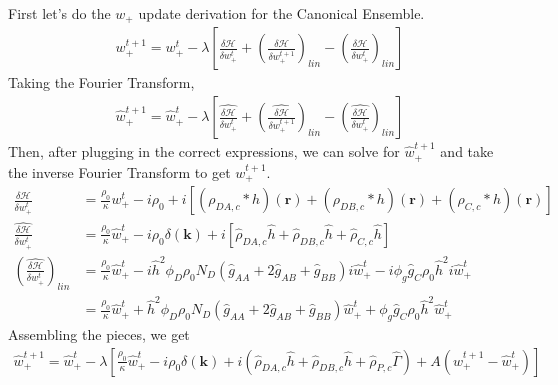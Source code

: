 \documentclass{article}
\begin{document}
  First let's do the $w_+$ update derivation for the Canonical Ensemble.
  \begin{align*}
    w_+^{t+1} =
      w_+^t - \lambda \left[
        \frac{\delta \mathcal{H}}{\delta w_+^t}
        + \left(  \frac{\delta \mathcal{H}}{\delta w_+^{t+1}} \right) _{lin}
        - \left(  \frac{\delta \mathcal{H}}{\delta w_+^{t}} \right) _{lin}
      \right]
  \end{align*}
  Taking the Fourier Transform,
  \begin{align*}
    \hat{w}_+^{t+1} =
      \hat{w}_+^t - \lambda \left[
        \hat{\frac{\delta \mathcal{H}}{\delta w_+^t}}
        + \left( \hat{ \frac{\delta \mathcal{H}}{\delta w_+^{t+1}}} \right) _{lin}
        - \left( \hat{ \frac{\delta \mathcal{H}}{\delta w_+^{t}}} \right) _{lin}
      \right]
  \end{align*}
  Then, after plugging in the correct expressions, we can solve for
    $\hat{w}_+^{t+1}$ and take the inverse Fourier Transform to get $w_+^{t+1}$.
  \begin{align*}
    \frac{\delta \mathcal{H}}{\delta w_+^t} &=
      \frac{\rho_0}{\kappa} w_+^t
      - i\rho_0
      + i [ (\rho_{DA,c} \ast h)(\mathbf{r})
            + (\rho_{DB,c} \ast h)(\mathbf{r})
            + (\rho_{C,c} \ast h)(\mathbf{r}) ] \\
    \hat{\frac{\delta \mathcal{H}}{\delta w_+^t}} &=
      \frac{\rho_0}{\kappa} \hat{w}_+^t
      - i \rho_0 \delta(\mathbf{k})
      + i [ \hat{\rho}_{DA,c} \hat{h}
            + \hat{\rho}_{DB,c} \hat{h}
            + \hat{\rho}_{C,c}  \hat{h} ] \\
    \left( \hat{\frac{\delta \mathcal{H}}{\delta w_+^t}} \right) _{lin} &=
      \frac{\rho_0}{\kappa} \hat{w}_+^t
      - i \hat{h}^2 \phi_D \rho_0 N_D
        (\hat{g}_{AA} + 2 \hat{g}_{AB} + \hat{g}_{BB}) i \hat{w}_+^t
      - i \phi_g \hat{g}_{C} \rho_0 \hat{h}^2 i \hat{w}_+^t \\
    &= \frac{\rho_0}{\kappa} \hat{w}_+^t
      + \hat{h}^2 \phi_D \rho_0 N_D
        (\hat{g}_{AA} + 2 \hat{g}_{AB} + \hat{g}_{BB}) \hat{w}_+^t
      + \phi_g \hat{g}_{C} \rho_0 \hat{h}^2 \hat{w}_+^t
  \end{align*}
  Assembling the pieces, we get
  \begin{align*}
    \hat{w}_+^{t+1} =
      \hat{w}_+^t - \lambda \left[
        \frac{\rho_0}{\kappa} \hat{w}_+^t
        - i \rho_0 \delta(\mathbf{k})
        + i ( \hat{\rho}_{DA,c} \hat{h}
              + \hat{\rho}_{DB,c} \hat{h}
              + \hat{\rho}_{P,c}  \hat{\Gamma} )
        + A (\hat{w}_+^{t+1} - \hat{w}_+^t)
      \right]
  \end{align*}
\end{document}
